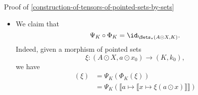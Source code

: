 \begin{Proof}{Proof of \cref{construction-of-tensors-of-pointed-sets-by-sets}}
\begin{itemize}
\[                \Sets(A,\Sets_{*}(X,K))%
                \to
                \Sets_{*}(A\odot X,K)
            \]%
            given by sending a map
            \begin{webcompile}
                \phantom{\xi\colon}
            \end{webcompile}
            to the morphism of pointed sets
            \[
                \xi^{\dagger}%
                \colon%
                (A\odot X,a\odot x_{0})%
                \to%
                (K,k_{0})%
            \]%
            defined by
            \[
                \xi^{\dagger}(a\odot x)%
                \defeq%
                \xi_{a}(x)%
            \]%
            for each $a\odot x\in A\odot X$. Note that $\xi^{\dagger}$ is indeed a morphism of pointed sets, as we have
            \begin{align*}
                \xi^{\dagger}(a\odot x_{0}) &\defeq \xi_{a}(x_{0})\\%
                                           &=      k_{0},
            \end{align*}
            where we have used that $\xi(a)\in\Sets_{*}(X,K)$ is a morphism of pointed sets.
        \item{}We claim that
            \[
                \Psi_{K}\circ\Phi_{K}%
                =%
                \id_{\Sets_{*}(A\odot X,K)}.%
            \]%
            Indeed, given a morphism of pointed sets
            \[
                \xi%
                \colon%
                (A\odot X,a\odot x_{0})%
                \to%
                (K,k_{0}),%
            \]%
            we have
            \begin{align*}
                [\Psi_{K}\circ\Phi_{K}](\xi) &= \Psi_{K}(\Phi_{K}(\xi))\\%
                                             &= \Psi_{K}(\llbracket a\mapsto\llbracket x\mapsto\xi(a\odot x)\rrbracket\rrbracket)\\%

\end{align*}
\end{itemize}
\end{Proof}
